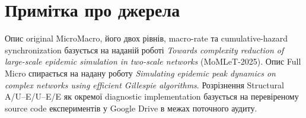 \documentclass[11pt,a4paper]{article}
\begin{document}
\section*{Примітка про джерела}
Опис original MicroMacro, його двох рівнів, macro-rate та cumulative-hazard synchronization базується на наданій роботі \textit{Towards complexity reduction of large-scale epidemic simulation in two-scale networks} (MoMLeT-2025). Опис Full Micro спирається на надану роботу \textit{Simulating epidemic peak dynamics on complex networks using efficient Gillespie algorithms}. Розрізнення Structural A/U--E/U--E/E як окремої diagnostic implementation базується на перевіреному source code експериментів у Google Drive в межах поточного аудиту.
\end{document}
